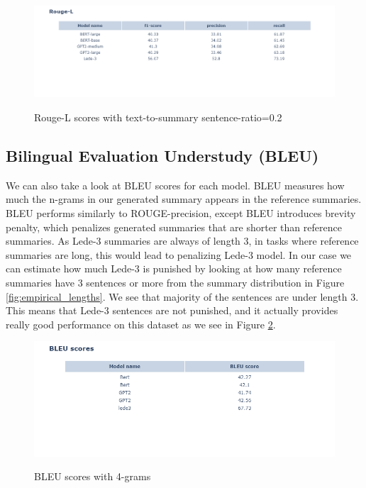 \documentclass{article}
\begin{document}
\begin{figure}[H]
	\centering
	\includegraphics[scale=0.4]{rougel.png}\\
	\caption{Rouge-L scores with text-to-summary sentence-ratio=0.2}
	\label{fig:rougel_02}
\end{figure}

\subsection{Bilingual Evaluation Understudy (BLEU)}

\noindent
We can also take a look at BLEU scores for each model. BLEU measures how much the n-grams in our generated summary appears in the reference summaries. BLEU performs similarly to ROUGE-precision, except BLEU introduces brevity penalty, which penalizes generated summaries that are shorter than reference summaries. As Lede-3 summaries are always of length 3, in tasks where reference summaries are long, this would lead to penalizing Lede-3 model. In our case we can estimate how much Lede-3 is punished by looking at how many reference summaries have 3 sentences or more from the summary distribution in Figure \ref{fig:empirical_lengths}. We see that majority of the sentences are under length 3. This means that Lede-3 sentences are not punished, and it actually provides really good performance on this dataset as we see in Figure \ref{fig:bleu}. 

\begin{figure}[H]
	\centering
	\includegraphics[scale=0.4]{bleu_scores.png}\\
	\caption{BLEU scores with 4-grams}
	\label{fig:bleu}
\end{figure}
\end{document}
